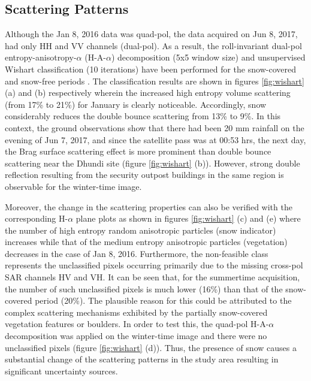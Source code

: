 \documentclass{article}
\begin{document}
\subsection{Scattering Patterns}
\label{ssec:scat}
Although the Jan 8, 2016 data was quad-pol, the data acquired on Jun 8, 2017, had only HH and VV channels (dual-pol). As a result, the roll-invariant dual-pol entropy-anisotropy-$\alpha$ (H-A-$\alpha$) decomposition (5x5 window size) and unsupervised Wishart classification (10 iterations) have been performed for the snow-covered and snow-free periods \cite{Singh2014}. The classification results are shown in figures \ref{fig:wishart} (a) and (b) respectively wherein the increased high entropy volume scattering (from 17\% to 21\%) for January is clearly noticeable. Accordingly, snow considerably reduces the double bounce scattering from 13\% to 9\%. In this context, the ground observations show that there had been 20 mm rainfall on the evening of Jun 7, 2017, and since the satellite pass was at 00:53 hrs, the next day, the Brag surface scattering effect is more prominent than double bounce scattering near the Dhundi site (figure \ref{fig:wishart} (b)). However, strong double reflection resulting from the security outpost buildings in the same region is observable for the winter-time image.  

Moreover, the change in the scattering properties can also be verified with the corresponding H-$\alpha$ plane plots as shown in figures \ref{fig:wishart} (c) and (e) where the number of high entropy random anisotropic particles (snow indicator) increases while that of the medium entropy anisotropic particles (vegetation) decreases in the case of Jan 8, 2016. Furthermore, the non-feasible class represents the unclassified pixels occurring primarily due to the missing cross-pol SAR channels HV and VH. It can be seen that, for the summertime acquisition, the number of such unclassified pixels is much lower (16\%) than that of the snow-covered period (20\%). The plausible reason for this could be attributed to the complex scattering mechanisms exhibited by the partially snow-covered vegetation features or boulders. In order to test this, the quad-pol H-A-$\alpha$ decomposition was applied on the winter-time image and there were no unclassified pixels (figure \ref{fig:wishart} (d)). Thus, the presence of snow causes a substantial change of the scattering patterns in the study area resulting in significant uncertainty sources.
\end{document}
